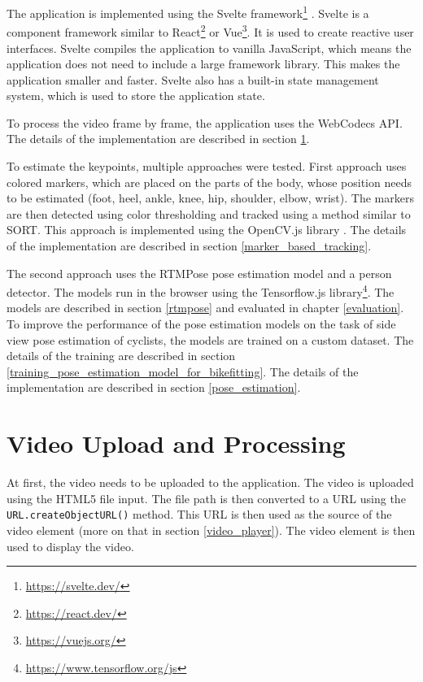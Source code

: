 The application is implemented using the Svelte framework\footnote{\url{https://svelte.dev/}} . Svelte is a component framework similar to React\footnote{\url{https://react.dev/}} or Vue\footnote{\url{https://vuejs.org/}}. It is used to create reactive user interfaces. Svelte compiles the application to vanilla JavaScript, which means the application does not need to include a large framework library. This makes the application smaller and faster. Svelte also has a built-in state management system, which is used to store the application state.

To process the video frame by frame, the application uses the WebCodecs API. The details of the implementation are described in section \ref{video_upload_and_processing}.

To estimate the keypoints, multiple approaches were tested. First approach uses colored markers, which are placed on the parts of the body, whose position needs to be estimated (foot, heel, ankle, knee, hip, shoulder, elbow, wrist). The markers are then detected using color thresholding and tracked using a method similar to SORT. This approach is implemented using the OpenCV.js library \cite{opencvjs}. The details of the implementation are described in section \ref{marker_based_tracking}.

The second approach uses the RTMPose pose estimation model and a person detector. The models run in the browser using the Tensorflow.js library\footnote{\url{https://www.tensorflow.org/js}}. The models are described in section \ref{rtmpose} and evaluated in chapter \ref{evaluation}. To improve the performance of the pose estimation models on the task of side view pose estimation of cyclists, the models are trained on a custom dataset. The details of the training are described in section \ref{training_pose_estimation_model_for_bikefitting}. The details of the implementation are described in section \ref{pose_estimation}.


\section{Video Upload and Processing}
\label{video_upload_and_processing}
At first, the video needs to be uploaded to the application. The video is uploaded using the HTML5 file input. The file path is then converted to a URL using the \texttt{URL.createObjectURL()} method. This URL is then used as the source of the video element (more on that in section \ref{video_player}). The video element is then used to display the video.

